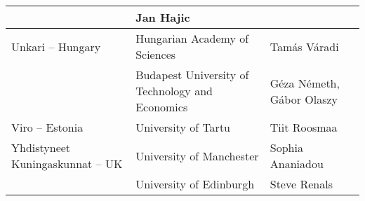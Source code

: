 \documentclass[]{../../metanetpaper}
\begin{document}
\begin{longtable}{p{3.5cm}|p{5.5cm}|p{5cm}}
 &  Jan Hajic
 \\ \hline
 Unkari -- Hungary
 &  Hungarian Academy of Sciences
 &  Tamás Váradi
 \\
 &  \raggedright Budapest University of            
    Technology and Economics
 &  Géza Németh,
    Gábor Olaszy
 \\ \hline
 Viro -- Estonia
 &  University of Tartu
 &  Tiit Roosmaa \\ \hline
 Yhdistyneet
 Kuningaskunnat -- UK
 &  University of Manchester
 &  Sophia Ananiadou \\
 &  University of Edinburgh
 &  Steve Renals
 \\ \hline
\end{longtable}


\end{document}
